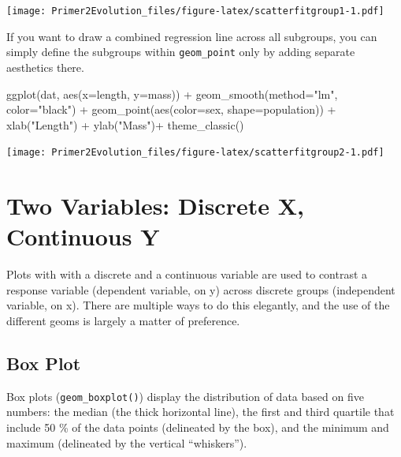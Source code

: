 \documentclass[
]{book}
\newenvironment{Shaded}{\begin{snugshade}}{\end{snugshade}}
\newcommand{\AttributeTok}[1]{\textcolor[rgb]{0.77,0.63,0.00}{#1}}
\newcommand{\FunctionTok}[1]{\textcolor[rgb]{0.00,0.00,0.00}{#1}}
\newcommand{\NormalTok}[1]{#1}
\newcommand{\SpecialCharTok}[1]{\textcolor[rgb]{0.00,0.00,0.00}{#1}}
\newcommand{\StringTok}[1]{\textcolor[rgb]{0.31,0.60,0.02}{#1}}
\begin{document}
\texttt{[image: Primer2Evolution\_files/figure-latex/scatterfitgroup1-1.pdf]}

If you want to draw a combined regression line across all subgroups, you can simply define the subgroups within \texttt{geom\_point} only by adding separate aesthetics there.

\begin{Shaded}
\begin{Highlighting}[]
\FunctionTok{ggplot}\NormalTok{(dat, }\FunctionTok{aes}\NormalTok{(}\AttributeTok{x=}\NormalTok{length, }\AttributeTok{y=}\NormalTok{mass)) }\SpecialCharTok{+}
    \FunctionTok{geom\_smooth}\NormalTok{(}\AttributeTok{method=}\StringTok{"lm"}\NormalTok{, }\AttributeTok{color=}\StringTok{"black"}\NormalTok{) }\SpecialCharTok{+}
    \FunctionTok{geom\_point}\NormalTok{(}\FunctionTok{aes}\NormalTok{(}\AttributeTok{color=}\NormalTok{sex, }\AttributeTok{shape=}\NormalTok{population)) }\SpecialCharTok{+}
    \FunctionTok{xlab}\NormalTok{(}\StringTok{"Length"}\NormalTok{) }\SpecialCharTok{+}
    \FunctionTok{ylab}\NormalTok{(}\StringTok{"Mass"}\NormalTok{)}\SpecialCharTok{+}
    \FunctionTok{theme\_classic}\NormalTok{()}
\end{Highlighting}
\end{Shaded}

\texttt{[image: Primer2Evolution\_files/figure-latex/scatterfitgroup2-1.pdf]}

\hypertarget{two-variables-discrete-x-continuous-y}{%
\section{Two Variables: Discrete X, Continuous Y}\label{two-variables-discrete-x-continuous-y}}

Plots with with a discrete and a continuous variable are used to contrast a response variable (dependent variable, on y) across discrete groups (independent variable, on x). There are multiple ways to do this elegantly, and the use of the different geoms is largely a matter of preference.

\hypertarget{box-plot}{%
\subsection{Box Plot}\label{box-plot}}

Box plots (\texttt{geom\_boxplot()}) display the distribution of data based on five numbers: the median (the thick horizontal line), the first and third quartile that include 50 \% of the data points (delineated by the box), and the minimum and maximum (delineated by the vertical ``whiskers'').
\end{document}
